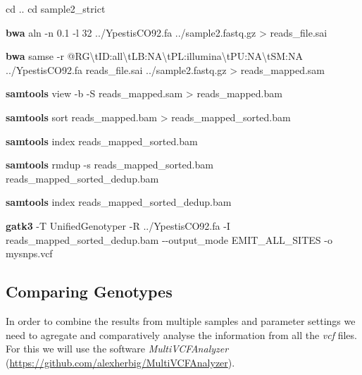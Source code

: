 \documentclass[
  letterpaper,
]{book}
\newenvironment{Shaded}{}{}
\newcommand{\AttributeTok}[1]{\textcolor[rgb]{0.84,0.23,0.29}{#1}}
\newcommand{\BuiltInTok}[1]{\textcolor[rgb]{0.84,0.23,0.29}{#1}}
\newcommand{\ExtensionTok}[1]{\textcolor[rgb]{0.84,0.23,0.29}{\textbf{#1}}}
\newcommand{\NormalTok}[1]{\textcolor[rgb]{0.14,0.16,0.18}{#1}}
\newcommand{\OperatorTok}[1]{\textcolor[rgb]{0.14,0.16,0.18}{#1}}
\newcommand{\StringTok}[1]{\textcolor[rgb]{0.01,0.18,0.38}{#1}}
\begin{document}
\begin{Shaded}
\begin{Highlighting}[]
\BuiltInTok{cd}\NormalTok{ ..}
\BuiltInTok{cd}\NormalTok{ sample2\_strict}

\ExtensionTok{bwa}\NormalTok{ aln }\AttributeTok{{-}n}\NormalTok{ 0.1 }\AttributeTok{{-}l}\NormalTok{ 32 ../YpestisCO92.fa ../sample2.fastq.gz }\OperatorTok{\textgreater{}}\NormalTok{ reads\_file.sai}

\ExtensionTok{bwa}\NormalTok{ samse }\AttributeTok{{-}r} \StringTok{\textquotesingle{}@RG\textbackslash{}tID:all\textbackslash{}tLB:NA\textbackslash{}tPL:illumina\textbackslash{}tPU:NA\textbackslash{}tSM:NA\textquotesingle{}}\NormalTok{ ../YpestisCO92.fa reads\_file.sai ../sample2.fastq.gz }\OperatorTok{\textgreater{}}\NormalTok{ reads\_mapped.sam}

\ExtensionTok{samtools}\NormalTok{ view }\AttributeTok{{-}b} \AttributeTok{{-}S}\NormalTok{ reads\_mapped.sam }\OperatorTok{\textgreater{}}\NormalTok{ reads\_mapped.bam}

\ExtensionTok{samtools}\NormalTok{ sort reads\_mapped.bam }\OperatorTok{\textgreater{}}\NormalTok{ reads\_mapped\_sorted.bam}

\ExtensionTok{samtools}\NormalTok{ index reads\_mapped\_sorted.bam}

\ExtensionTok{samtools}\NormalTok{ rmdup }\AttributeTok{{-}s}\NormalTok{ reads\_mapped\_sorted.bam reads\_mapped\_sorted\_dedup.bam}

\ExtensionTok{samtools}\NormalTok{ index reads\_mapped\_sorted\_dedup.bam}

\ExtensionTok{gatk3} \AttributeTok{{-}T}\NormalTok{ UnifiedGenotyper }\AttributeTok{{-}R}\NormalTok{ ../YpestisCO92.fa }\AttributeTok{{-}I}\NormalTok{ reads\_mapped\_sorted\_dedup.bam }\AttributeTok{{-}{-}output\_mode}\NormalTok{ EMIT\_ALL\_SITES }\AttributeTok{{-}o}\NormalTok{ mysnps.vcf}
\end{Highlighting}
\end{Shaded}

\hypertarget{comparing-genotypes}{%
\subsection{Comparing Genotypes}\label{comparing-genotypes}}

In order to combine the results from multiple samples and parameter
settings we need to agregate and comparatively analyse the information
from all the \emph{vcf} files. For this we will use the software
\emph{MultiVCFAnalyzer}
(\url{https://github.com/alexherbig/MultiVCFAnalyzer}).
\end{document}

